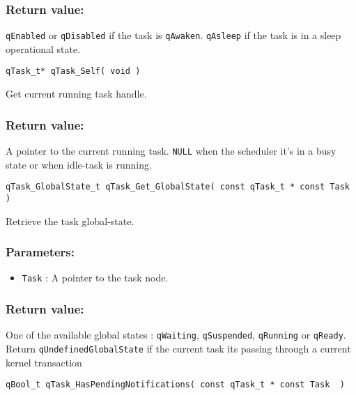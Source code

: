 \subsubsection*{Return value:}
\lstinline{qEnabled} or \lstinline{qDisabled} if the task is \lstinline{qAwaken}. \lstinline{qAsleep} if the task is in a sleep operational state.

\noindent\hrulefill


\begin{lstlisting}[style=CStyle]
qTask_t* qTask_Self( void )
\end{lstlisting}

Get current running task handle. 

\subsubsection*{Return value:}
A pointer to the current running task. \lstinline{NULL} when the scheduler it's in a busy state or when idle-task is running.


\noindent\hrulefill


\begin{lstlisting}[style=CStyle]
qTask_GlobalState_t qTask_Get_GlobalState( const qTask_t * const Task )
\end{lstlisting}

Retrieve the task global-state. 

\subsubsection*{Parameters:}
\begin{itemize}
    \item \lstinline{Task} : A pointer to the task node.
\end{itemize}


\subsubsection*{Return value:}
One of the available global states : \lstinline{qWaiting}, \lstinline{qSuspended}, \lstinline{qRunning} or \lstinline{qReady}.
Return \lstinline{qUndefinedGlobalState} if the current task its passing through a current kernel transaction

\noindent\hrulefill

\begin{lstlisting}[style=CStyle]
qBool_t qTask_HasPendingNotifications( const qTask_t * const Task  )
\end{lstlisting}

